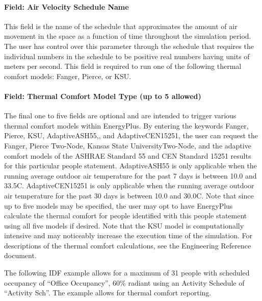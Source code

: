 \paragraph{Field: Air Velocity Schedule Name}\label{field-air-velocity-schedule-name}

This field is the name of the schedule that approximates the amount of air movement in the space as a function of time throughout the simulation period. The user has control over this parameter through the schedule that requires the individual numbers in the schedule to be positive real numbers having units of meters per second. This field is required to run one of the following thermal comfort models: Fanger, Pierce, or KSU.

\paragraph{Field: Thermal Comfort Model Type (up to 5 allowed)}\label{field-thermal-comfort-model-type-up-to-5-allowed}

The final one to five fields are optional and are intended to trigger various thermal comfort models within EnergyPlus. By entering the keywords Fanger, Pierce, KSU, AdaptiveASH55,, and AdaptiveCEN15251, the user can request the Fanger, Pierce Two-Node, Kansas State UniversityTwo-Node, and the adaptive comfort models of the ASHRAE Standard 55 and CEN Standard 15251 results for this particular people statement. AdaptiveASH55 is only applicable when the running average outdoor air temperature for the past 7 days is between 10.0 and 33.5C. AdaptiveCEN15251 is only applicable when the running average outdoor air temperature for the past 30 days is between 10.0 and 30.0C. Note that since up to five models may be specified, the user may opt to have EnergyPlus calculate the thermal comfort for people identified with this people statement using all five models if desired. Note that the KSU model is computationally intensive and may noticeably increase the execution time of the simulation. For descriptions of the thermal comfort calculations, see the Engineering Reference document.

The following IDF example allows for a maximum of 31 people with scheduled occupancy of ``Office Occupancy'', 60\% radiant using an Activity Schedule of ``Activity Sch''. The example allows for thermal comfort reporting.

